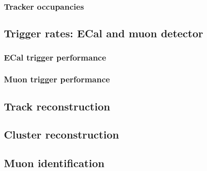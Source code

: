 \subsubsection{Tracker occupancies}

\subsection{Trigger rates: ECal and muon detector}

\subsubsection{ECal trigger performance}


\subsubsection{Muon trigger performance}

\subsection{Track reconstruction}

\subsection{Cluster reconstruction}

\subsection{Muon identification}

